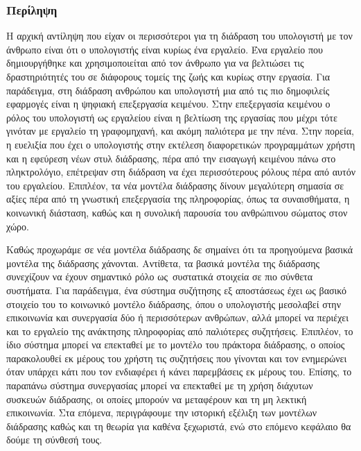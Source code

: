 \documentclass[
]{article}
\begin{document}
\hypertarget{ux3c0ux3b5ux3c1ux3afux3bbux3b7ux3c8ux3b7}{%
\subsubsection{Περίληψη}\label{ux3c0ux3b5ux3c1ux3afux3bbux3b7ux3c8ux3b7}}

Η αρχική αντίληψη που είχαν οι περισσότεροι για τη διάδραση του
υπολογιστή με τον άνθρωπο είναι ότι ο υπολογιστής είναι κυρίως ένα
εργαλείο. Ένα εργαλείο που δημιουργήθηκε και χρησιμοποιείται από τον
άνθρωπο για να βελτιώσει τις δραστηριότητές του σε διάφορους τομείς της
ζωής και κυρίως στην εργασία. Για παράδειγμα, στη διάδραση ανθρώπου και
υπολογιστή μια από τις πιο δημοφιλείς εφαρμογές είναι η ψηφιακή
επεξεργασία κειμένου. Στην επεξεργασία κειμένου ο ρόλος του υπολογιστή
ως εργαλείου είναι η βελτίωση της εργασίας που μέχρι τότε γινόταν με
εργαλείο τη γραφομηχανή, και ακόμη παλιότερα με την πένα. Στην πορεία, η
ευελιξία που έχει ο υπολογιστής στην εκτέλεση διαφορετικών προγραμμάτων
χρήστη και η εφεύρεση νέων στυλ διάδρασης, πέρα από την εισαγωγή
κειμένου πάνω στο πληκτρολόγιο, επέτρεψαν στη διάδραση να έχει
περισσότερους ρόλους πέρα από αυτόν του εργαλείου. Επιπλέον, τα νέα
μοντέλα διάδρασης δίνουν μεγαλύτερη σημασία σε αξίες πέρα από τη
γνωστική επεξεργασία της πληροφορίας, όπως τα συναισθήματα, η κοινωνική
διάσταση, καθώς και η συνολική παρουσία του ανθρώπινου σώματος στον
χώρο.

Καθώς προχωράμε σε νέα μοντέλα διάδρασης δε σημαίνει ότι τα προηγούμενα
βασικά μοντέλα της διάδρασης χάνονται. Αντίθετα, τα βασικά μοντέλα της
διάδρασης συνεχίζουν να έχουν σημαντικό ρόλο ως~συστατικά στοιχεία σε
πιο σύνθετα συστήματα. Για παράδειγμα, ένα σύστημα συζήτησης εξ
αποστάσεως έχει ως βασικό στοιχείο του το κοινωνικό μοντέλο διάδρασης,
όπου ο υπολογιστής μεσολαβεί στην επικοινωνία και συνεργασία δύο ή
περισσότερων ανθρώπων, αλλά μπορεί να περιέχει και το εργαλείο της
ανάκτησης πληροφορίας από παλιότερες συζητήσεις. Επιπλέον, το ίδιο
σύστημα μπορεί να επεκταθεί με το μοντέλο του πράκτορα διάδρασης, ο
οποίος παρακολουθεί εκ μέρους του χρήστη τις συζητήσεις που γίνονται και
τον ενημερώνει όταν υπάρχει κάτι που τον ενδιαφέρει ή κάνει παρεμβάσεις
εκ μέρους του. Επίσης, το παραπάνω σύστημα συνεργασίας μπορεί να
επεκταθεί με τη χρήση διάχυτων συσκευών διάδρασης, οι οποίες μπορούν να
μεταφέρουν και τη μη λεκτική επικοινωνία. Στα επόμενα, περιγράφουμε την
ιστορική εξέλιξη των μοντέλων διάδρασης καθώς και τη θεωρία για καθένα
ξεχωριστά, ενώ στο επόμενο κεφάλαιο θα δούμε τη σύνθεσή τους.
\end{document}
